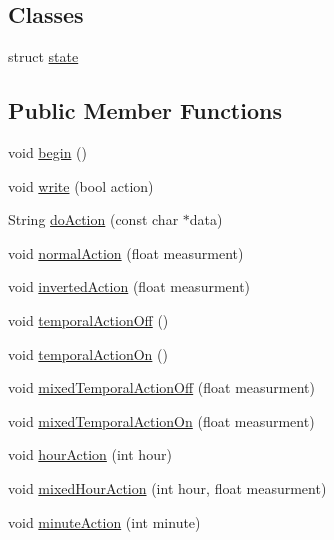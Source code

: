 \subsection*{Classes}
\begin{DoxyCompactItemize}
\item 
struct \hyperlink{class_cool_board_actor_d5/ddc/struct_cool_board_actor_1_1state}{state}
\end{DoxyCompactItemize}
\subsection*{Public Member Functions}
\begin{DoxyCompactItemize}
\item 
void \hyperlink{class_cool_board_actor_a7f4422fd85a5510bc2cdfd68e109be5e}{begin} ()
\item 
void \hyperlink{class_cool_board_actor_a958786ff01ea1056ee72c72d439f86da}{write} (bool action)
\item 
String \hyperlink{class_cool_board_actor_a3323ba7aaa4bef3ff084dcd830fe9b61}{do\+Action} (const char $\ast$data)
\item 
void \hyperlink{class_cool_board_actor_a81229abf5895f4d3b0355050b822b438}{normal\+Action} (float measurment)
\item 
void \hyperlink{class_cool_board_actor_aae82b2e62f91be009d40f93c206f9bda}{inverted\+Action} (float measurment)
\item 
void \hyperlink{class_cool_board_actor_a02698bd647df49cabbe74513d4d88918}{temporal\+Action\+Off} ()
\item 
void \hyperlink{class_cool_board_actor_ada603785c203fdb0b41cc967d70bdc4d}{temporal\+Action\+On} ()
\item 
void \hyperlink{class_cool_board_actor_a00b29c4abf0388551aa6812372113cf1}{mixed\+Temporal\+Action\+Off} (float measurment)
\item 
void \hyperlink{class_cool_board_actor_a216aa7a0cfd1f31d0025cc91c2ecd5dd}{mixed\+Temporal\+Action\+On} (float measurment)
\item 
void \hyperlink{class_cool_board_actor_adf3b4e15b9d73681082112adf8ef95cb}{hour\+Action} (int hour)
\item 
void \hyperlink{class_cool_board_actor_a6d93a24502c56ced2ef7675c913a276b}{mixed\+Hour\+Action} (int hour, float measurment)
\item 
void \hyperlink{class_cool_board_actor_af000944ce0b9abb9c6ee4b8fe839fb36}{minute\+Action} (int minute)
\item 

\end{DoxyCompactItemize}
